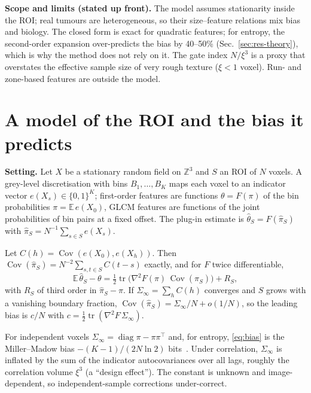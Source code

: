 \documentclass[runningheads]{llncs}
\newcommand{\E}{\mathbb{E}}
\newcommand{\Cov}{\operatorname{Cov}}
\begin{document}
\noindent\textbf{Scope and limits (stated up front).} The model assumes stationarity inside the ROI; real tumours are heterogeneous, so their size--feature relations mix bias and biology. The closed form is exact for quadratic features; for entropy, the second-order expansion over-predicts the bias by 40--50\% (Sec.~\ref{sec:res-theory}), which is why the method does not rely on it. The gate index $N/\xi^3$ is a proxy that overstates the effective sample size of very rough texture ($\xi<1$ voxel). Run- and zone-based features are outside the model.

\section{A model of the ROI and the bias it predicts}\label{sec:model}
\noindent\textbf{Setting.} Let $X$ be a stationary random field on $\mathbb{Z}^3$ and $S$ an ROI of $N$ voxels. A grey-level discretisation with bins $B_1,\dots,B_K$ maps each voxel to an indicator vector $e(X_s)\in\{0,1\}^K$; first-order features are functions $\theta=F(\pi)$ of the bin probabilities $\pi=\E\,e(X_0)$, GLCM features are functions of the joint probabilities of bin pairs at a fixed offset. The plug-in estimate is $\hat\theta_S=F(\hat\pi_S)$ with $\hat\pi_S=N^{-1}\sum_{s\in S}e(X_s)$.

\begin{proposition}\label{prop:bias}
Let $C(h)=\Cov(e(X_0),e(X_h))$. Then $\Cov(\hat\pi_S)=N^{-2}\sum_{s,t\in S}C(t-s)$ exactly, and for $F$ twice differentiable,
\begin{equation}
\E\,\hat\theta_S-\theta=\tfrac12\operatorname{tr}\!\big(\nabla^2F(\pi)\,\Cov(\hat\pi_S)\big)+R_S,\label{eq:bias}
\end{equation}
with $R_S$ of third order in $\hat\pi_S-\pi$. If $\Sigma_\infty=\sum_h C(h)$ converges and $S$ grows with a vanishing boundary fraction, $\Cov(\hat\pi_S)=\Sigma_\infty/N+o(1/N)$, so the leading bias is $c/N$ with $c=\tfrac12\operatorname{tr}(\nabla^2F\,\Sigma_\infty)$.
\end{proposition}
\noindent For independent voxels $\Sigma_\infty=\operatorname{diag}\pi-\pi\pi^\top$ and, for entropy, \eqref{eq:bias} is the Miller--Madow bias $-(K-1)/(2N\ln2)$ bits~\cite{miller1955}. Under correlation, $\Sigma_\infty$ is inflated by the sum of the indicator autocovariances over all lags, roughly the correlation volume $\xi^3$ (a ``design effect''). The constant is unknown and image-dependent, so independent-sample corrections under-correct.
\end{document}
